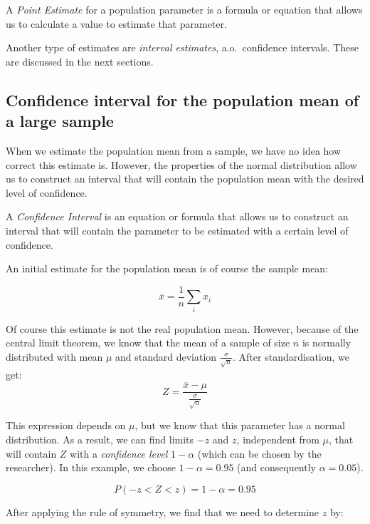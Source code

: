\begin{definition}
  A \emph{Point Estimate} for a population parameter is a formula or equation that allows us to calculate a value to estimate that parameter.
\end{definition}

Another type of estimates are \emph{interval estimates}, a.o.~confidence intervals. These are discussed in the next sections.

\subsection{Confidence interval for the population mean of a large sample}
\label{ssec:confidence-interval-pop-mean-large-sample}

When we estimate the population mean from a sample, we have no idea how correct this estimate is. However, the properties of the normal distribution allow us to construct an interval that will contain the population mean with the desired level of confidence.

\begin{definition}
  A \emph{Confidence Interval} is an equation or formula that allows us to construct an interval that will contain the parameter to be estimated with a certain level of confidence.
\end{definition}

An initial estimate for the population mean is of course the sample mean:

\[ \overline{x} = \frac{1}{n} \sum_{i} x_{i} \]

Of course this estimate is not the real population mean. However, because of the central limit theorem, we know that the mean of a sample of size $n$ is normally distributed with mean $\mu$ and standard deviation $\frac{\sigma}{\sqrt{n}}$.
After standardisation, we get:
\[ Z = \frac{\overline{x} - \mu}{\frac{\sigma}{\sqrt{n}}} \]

This expression depends on $\mu$, but we know that this parameter has a normal distribution. As a result, we can find limits $-z$ and $z$, independent from $\mu$, that will contain $Z$ with a \emph{confidence level} $1 - \alpha$ (which can be chosen by the researcher). In this example, we choose $1 - \alpha= 0.95$ (and consequently $\alpha = 0.05$).

\[P(-z < Z < z) = 1 - \alpha = 0.95 \]

After applying the rule of symmetry, we find that we need to determine $z$ by:

